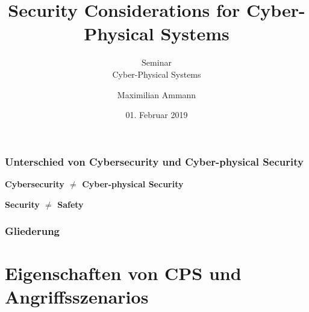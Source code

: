 \documentclass{sikslides}
\title[Security Considerations for CPS]{Security Considerations for Cyber-Physical Systems}
\subtitle{Seminar \\Cyber-Physical Systems} %
\author{Maximilian Ammann}
\date[01.02.2019]{01. Februar 2019}
\begin{document}
    \titleframe

    \begin{frame}
        \frametitle{Unterschied von Cybersecurity und Cyber-physical Security}
        \centering


        \pause
        \vspace{4mm}
        \textbf{Cybersecurity $\neq$ Cyber-physical Security}

        \textbf{Security $\neq$ Safety}
    \end{frame}

    \begin{frame}
        \frametitle{Gliederung}
    \end{frame}

    \section{Eigenschaften von CPS und Angriffsszenarios}
\end{document}

